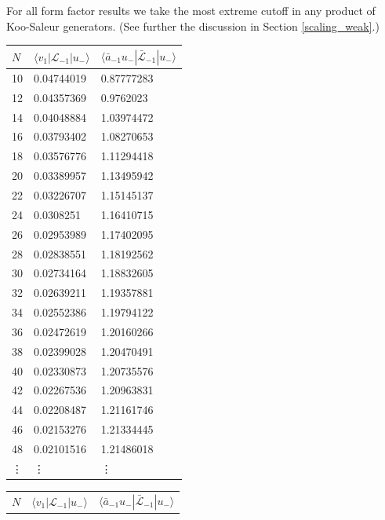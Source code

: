 \documentclass[a4paper,10pt]{article}
\begin{document}

For all form factor results we take the most extreme cutoff in any product of Koo-Saleur generators. (See further the discussion in Section \ref{scaling_weak}.)


\begin{table}[H]
\center
\begin{minipage}{0.5\textwidth} 
\center
\begin{tabular}{lll}
$N$      & $\langle v_1| {\mathcal L}_{-1} | u_- \rangle$  & $\langle \bar{a}_{-1}u_- |\bar{\mathcal L}_{-1}| u_- \rangle$    \\
\hline
 10   & 0.04744019 & 0.87777283 \\
 12   & 0.04357369 & 0.9762023  \\
 14   & 0.04048884 & 1.03974472 \\
 16   & 0.03793402 & 1.08270653 \\
 18   & 0.03576776 & 1.11294418 \\
 20   & 0.03389957 & 1.13495942 \\
 22   & 0.03226707 & 1.15145137 \\
 24   & 0.0308251  & 1.16410715 \\
 26   & 0.02953989 & 1.17402095 \\
 28   & 0.02838551 & 1.18192562 \\
 30   & 0.02734164 & 1.18832605 \\
 32   & 0.02639211 & 1.19357881 \\
 34   & 0.02552386 & 1.19794122 \\
 36   & 0.02472619 & 1.20160266 \\
 38   & 0.02399028 & 1.20470491 \\
 40   & 0.02330873 & 1.20735576 \\
 42   & 0.02267536 & 1.20963831 \\
 44   & 0.02208487 & 1.21161746 \\
 46   & 0.02153276 & 1.21334445 \\
 48   & 0.02101516 & 1.21486018 \\
\vdots & \vdots & \vdots  \\ 
\end{tabular}
\end{minipage}%
\begin{minipage}{0.5\textwidth} 
\center
 \begin{tabular}{lll}
  $N$    & $\langle v_1 | {\mathcal L}_{-1} | u_- \rangle$  & $\langle \bar{a}_{-1}u_- |\bar{\mathcal L}_{-1}| u_- \rangle$    \\

\end{tabular}
\end{minipage}
\end{table}
\end{document}
